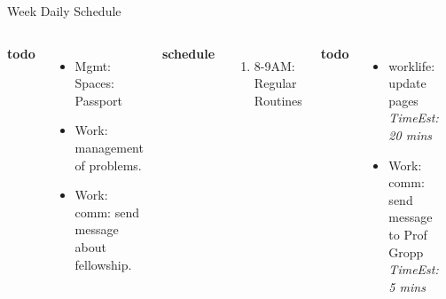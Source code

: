 \documentclass[serif, mathserif, final]{beamer}
\newcommand{\te}[1]{\textit{TimeEst:} \textit{#1}}
\begin{document}
\begin{frame}{}
\begin{columns}
\begin{column}{0.50\linewidth}
      \begin{block}{Week Daily Schedule}
        \begin{columns} 
          \textbf{\small todo} \\ 
          \begin{itemize}
            \tiny \item \tiny Mgmt: Spaces: Passport
          \item \tiny Work: management of problems.
          \item \tiny Work: comm: send message about fellowship.
          \end{itemize} 
          \textbf{\small schedule} \\
          \begin{enumerate} 
            \tiny \item \tiny 8-9AM: Regular Routines 
          \end{enumerate} 
          
          \textbf{\small todo} \\
  \begin{itemize}
    \tiny \item \tiny worklife: update pages \te{20 mins}
    \item \tiny Work: comm: send message to Prof Gropp \te{5 mins} 
  \end{itemize}  
  \textbf{\small schedule}\\ 
  \begin{enumerate} 
    \tiny \item \tiny 8-9AM: Regular Routines 
  \end{enumerate} 

  \textbf{\small todo} \\
  \begin{itemize}
\tiny \item \tiny 

  \end{itemize}
  \textbf{\small schedule} \\
  \begin{enumerate}
    \tiny \item \tiny 8-9AM: Regular Routines 
  \end{enumerate}
  

\end{columns}
\end{block}
\end{column}
\end{columns}
\end{frame}
\end{document}
